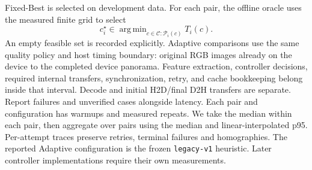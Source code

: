Fixed-Best is selected on development data. For each pair, the offline oracle
uses the measured finite grid to select
\begin{equation}
c_i^\star\in\mathop{\mathrm{arg\,min}}_{c\in\mathcal C:\mathcal P_i(c)}T_i(c).
\end{equation}
An empty feasible set is recorded explicitly. Adaptive comparisons
use the same quality policy and host timing boundary: original RGB images
already on the device to the completed device panorama. Feature extraction,
controller decisions, required internal transfers, synchronization, retry, and
cache bookkeeping belong inside that interval. Decode and initial H2D/final D2H
transfers are separate. Report failures and unverified cases alongside latency.
Each pair and configuration has \ChWarmups{} warmups and \ChRepeats{} measured
repeats. We take the median within each pair, then aggregate over pairs using
the median and linear-interpolated p95. Per-attempt traces preserve retries,
terminal failures and homographies. The reported Adaptive configuration is
the frozen \texttt{legacy-v1} heuristic. Later controller implementations require
their own measurements.





